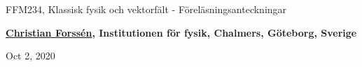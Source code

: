 \documentclass[%
oneside,                 %
final,                   %
10pt]{article}
\begin{document}

\newcommand{\exercisesection}[1]{\subsection*{#1}}







\thispagestyle{empty}

\begin{center}
{\LARGE\bf
\begin{spacing}{1.25}
FFM234, Klassisk fysik och vektorfält - Föreläsningsanteckningar
\end{spacing}
}
\end{center}


\begin{center}
{\bf \href{{http://fy.chalmers.se/subatom/tsp/}}{Christian Forssén}, Institutionen för fysik, Chalmers, Göteborg, Sverige${}^{}$} \\ [0mm]
\end{center}

\begin{center}
\end{center}
    

\begin{center}
Oct 2, 2020
\end{center}

\vspace{1cm}
\end{document}
